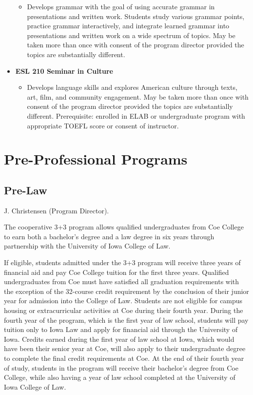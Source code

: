 \documentclass[
  letterpaper,
]{scrbook}
\providecommand{\tightlist}{%
  \setlength{\itemsep}{0pt}\setlength{\parskip}{0pt}}
\begin{document}
\begin{itemize}
  \begin{itemize}
  \tightlist
  \item
    Develops grammar with the goal of using accurate grammar in
    presentations and written work. Students study various grammar
    points, practice grammar interactively, and integrate learned
    grammar into presentations and written work on a wide spectrum of
    topics. May be taken more than once with consent of the program
    director provided the topics are substantially different.
  \end{itemize}
\item
  \textbf{ESL 210 Seminar in Culture}

  \begin{itemize}
  \tightlist
  \item
    Develops language skills and explores American culture through
    texts, art, film, and community engagement. May be taken more than
    once with consent of the program director provided the topics are
    substantially different. Prerequisite: enrolled in ELAB or
    undergraduate program with appropriate TOEFL score or consent of
    instructor.
  \end{itemize}
\end{itemize}

\section{Pre-Professional Programs}\label{pre-professional-programs}

\subsection{Pre-Law}\label{pre-law}

J. Christensen (Program Director).

The cooperative 3+3 program allows qualified undergraduates from Coe
College to earn both a bachelor's degree and a law degree in six years
through partnership with the University of Iowa College of Law.

If eligible, students admitted under the 3+3 program will receive three
years of financial aid and pay Coe College tuition for the first three
years. Qualified undergraduates from Coe must have satisfied all
graduation requirements with the exception of the 32-course credit
requirement by the conclusion of their junior year for admission into
the College of Law. Students are not eligible for campus housing or
extracurricular activities at Coe during their fourth year. During the
fourth year of the program, which is the first year of law school,
students will pay tuition only to Iowa Law and apply for financial aid
through the University of Iowa. Credits earned during the first year of
law school at Iowa, which would have been their senior year at Coe, will
also apply to their undergraduate degree to complete the final credit
requirements at Coe. At the end of their fourth year of study, students
in the program will receive their bachelor's degree from Coe College,
while also having a year of law school completed at the University of
Iowa College of Law.
\end{document}
